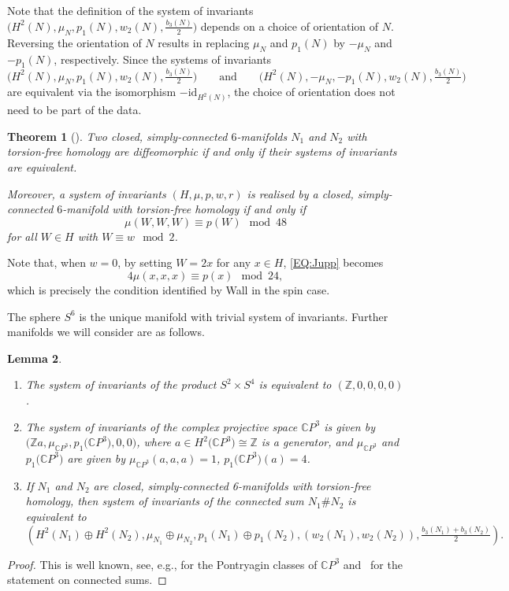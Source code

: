 \documentclass[10pt,a4paper]{amsart}
\numberwithin{equation}{section}
\newtheorem{Theorem}{Theorem}[section]
\newtheorem{Lemma}[Theorem]{Lemma}
\theoremstyle{definition}
\numberwithin{table}{section}
\newcommand{\Z}{\mathbb{Z}}
\newcommand{\C}{\mathbb{C}}
\begin{document}
Note that the definition of the system of invariants $\bigl(H^2(N),\mu_N,p_1(N),w_2(N),\frac{b_3(N)}{2}\bigr)$ depends on a choice of orientation of $N$. Reversing the orientation of $N$ results in replacing $\mu_N$ and $p_1(N)$ by $-\mu_N$ and $-p_1(N)$, respectively. Since the systems of invariants
\[\Big(H^2(N),\mu_N,p_1(N),w_2(N),\tfrac{b_3(N)}{2}\Big)\qquad \text{and}\qquad \Big(H^2(N),-\mu_N,-p_1(N),w_2(N),\tfrac{b_3(N)}{2}\Big)\]
are equivalent via the isomorphism $-\mathrm{id}_{H^2(N)}$, the choice of orientation does not need to be part of the data.

\begin{Theorem}[{\cite{Ju73}}]\label{T:Jupp}
	Two closed, simply-connected $6$-manifolds $N_1$ and $N_2$ with torsion-free homology are diffeomorphic if and only if their systems of invariants are equivalent.
	
	Moreover, a system of invariants $(H,\mu,p,w,r)$ is realised by a closed, simply-connected $6$-manifold with torsion-free homology if and only if
	\begin{equation}\label{EQ:Jupp}
		\mu(W,W,W)\equiv p(W)\mod 48
	\end{equation}
	for all $W\in H$ with $W\equiv w\mod 2$.
\end{Theorem}
Note that, when $w=0$, by setting $W=2x$ for any $x\in H$, \eqref{EQ:Jupp} becomes
\begin{equation}\label{EQ:Wall}
	4\mu(x,x,x)\equiv p(x)\mod 24,
\end{equation}
which is precisely the condition identified by Wall \cite[Theorem 5]{Wa66} in the spin case.

The sphere $S^6$ is the unique manifold with trivial system of invariants. Further manifolds we will consider are as follows.

\begin{Lemma}\label{L:inv_examples}\qquad
	\begin{enumerate}\itemsep=0pt
		\item[$(1)$] The system of invariants of the product $S^2\times S^4$ is equivalent to $(\Z,0,0,0,0)$.
		\item[$(2)$] The system of invariants of the complex projective space $\C P^3$ is given by $\bigl(\Z a,\mu_{\C P^3},\allowbreak p_1\bigl(\C P^3\bigr),0,0\bigr)$, where $a\in H^2\bigl(\C P^3\bigr)\cong \Z$ is a generator, and $\mu_{\C P^3}$ and $p_1\bigl(\C P^3\bigr)$ are given by
$\mu_{\C P^3}(a,a,a)=1$, $p_1\bigl(\C P^3\bigr)(a)=4$.
		\item[$(3)$] If $N_1$ and $N_2$ are closed, simply-connected 6-manifolds with torsion-free homology, then system of invariants of the connected sum $N_1\# N_2$ is equivalent to
		\[ \left(H^2(N_1)\oplus H^2(N_2),\mu_{N_1}\oplus\mu_{N_2},p_1(N_1)\oplus p_1(N_2),(w_2(N_1),w_2(N_2)),\tfrac{b_3(N_1)+b_3(N_2)}{2}  \right). \]
	\end{enumerate}
\end{Lemma}
\begin{proof}
	This is well known, see, e.g., \cite[Example~15.6]{MS74} for the Pontryagin classes of $\C P^3$ and~\mbox{\cite[Lemma~4.1.4]{Re22}} for the statement on connected sums.
\end{proof}
\end{document}
